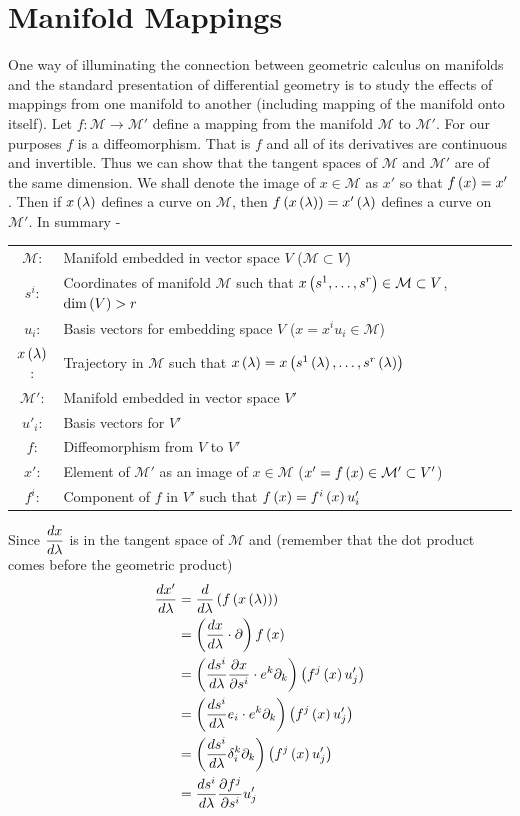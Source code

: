 \section{Manifold Mappings}
One way of illuminating the connection between geometric calculus on manifolds and the standard presentation of differential geometry
is to study the effects of mappings from one manifold to another (including mapping of the manifold onto itself). Let 
$f:\mathcal{M}\rightarrow\mathcal{M}'$ define a mapping from the manifold $\mathcal{M}$ to $\mathcal{M}'$.  For our purposes $f$ is a
diffeomorphism.  That is $f$ and all of its derivatives are continuous and invertible. Thus we can show that the tangent spaces of 
$\mathcal{M}$ and $\mathcal{M'}$ are of the same dimension.  We shall denote the image of $x \in \mathcal{M}$
as $x'$ so that ${f}\left ( {x} \right ) = x'$. Then if ${x}\left ( {\lambda} \right )$ defines a curve on $\mathcal{M}$, then ${f}\left ( {{x}\left ( {\lambda} \right )} \right ) = {x'}\left ( {\lambda} \right )$
defines a curve on $\mathcal{M'}$.  In summary -
\begin{center}
\begin{tabular}{cl}
$\mathcal{M}$: & Manifold embedded in vector space $V$ ($\mathcal{M} \subset V$) \\
$s^{i}$: & Coordinates of manifold $\mathcal{M}$ such that ${x}\left ( {s^{1},\dots,s^{r}} \right ) \in \mathcal{M}\subset V$, ${\dim}\left ( {V} \right ) > r$ \\
$u_{i}$: & Basis vectors for embedding space $V$ ($x=x^{i}u_{i}\in\mathcal{M}$)\\
${x}\left ( {\lambda} \right )$: & Trajectory in $\mathcal{M}$ such that ${x}\left ( {\lambda} \right ) = {x}\left ( {{s^{1}}\left ( {\lambda} \right ),\dots,{s^{r}}\left ( {\lambda} \right )} \right )$ \\
$\mathcal{M'}$: & Manifold embedded in vector space $V'$ \\
$u'_{i}$: & Basis vectors for $V'$  \\
$f$: & Diffeomorphism from $V$ to $V'$ \\
$x'$: & Element of $\mathcal{M'}$ as an image of $x\in\mathcal{M}$ ($x'={f}\left ( {x} \right )\in\mathcal{M'}\subset V'$) \\
$f^{i}$: & Component of $f$ in $V'$ such that ${f}\left ( {x} \right )={f^{i}}\left ( {x} \right ) u'_{i}$
\end{tabular}
\end{center}
Since $\displaystyle\frac{d{x}}{d{\lambda}}$ is in the tangent space of $\mathcal{M}$ and (remember that the dot product comes 
before the geometric product)
\begin{align}
	\displaystyle\frac{d{x'}}{d{\lambda}} &= \displaystyle\frac{d{}}{d{\lambda}}\left ( {{f}\left ( {{x}\left ( {\lambda} \right )} \right )} \right ) \nonumber \\
	&= \left ( {\displaystyle\frac{d{x}}{d{\lambda}}\cdot\partial} \right ){f}\left ( {x} \right ) \nonumber \\
	&=\left ( {\displaystyle\frac{d{s^{i}}}{d{\lambda}}\displaystyle\frac{\partial{x}}{\partial{s^{i}}}\cdot e^{k}\partial_{k}} \right )\left ( {{f^{j}}\left ( {x} \right ) u'_{j}} \right ) \nonumber \\
	&=\left ( {\displaystyle\frac{d{s^{i}}}{d{\lambda}}e_{i}\cdot e^{k}\partial_{k}} \right )\left ( {{f^{j}}\left ( {x} \right ) u'_{j}} \right )  \nonumber \\
	&=\left ( {\displaystyle\frac{d{s^{i}}}{d{\lambda}}\delta_{i}^{k}\partial_{k}} \right )\left ( {{f^{j}}\left ( {x} \right ) u'_{j}} \right )  \nonumber \\
	&=\displaystyle\frac{d{s^{i}}}{d{\lambda}}\displaystyle\frac{\partial{f^{j}}}{\partial{s^{i}}}u'_{j}
\end{align}
